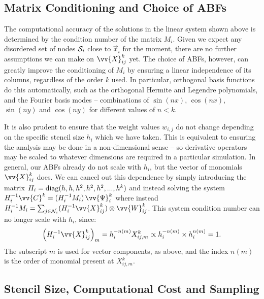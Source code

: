 \subsection{Matrix Conditioning and Choice of ABFs}

The computational accuracy of the solutions in the linear system shown above is determined by the condition number of the matrix $M_i$. Given we expect any disordered set of nodes $\cl{S}_i$ close to $\vec{x}_i$ for the moment, there are no further assumptions we can make on $\vv{X}^k_{ij}$ yet. The choice of ABFs, however, can greatly improve the conditioning of $M_i$ by ensuring a linear independence of its columns, regardless of the order $k$ used. In particular, orthogonal basis functions do this automatically, such as the orthogonal Hermite and Legendre polynomials, and the Fourier basis modes -- combinations of $\sin(nx)$, $\cos(nx)$, $\sin(ny)$ and $\cos(ny)$ for different values of $n < k$.

It is also prudent to ensure that the weight values $w_{i ,j}$ do not change depending on the specific stencil size $h_i$ which we have taken. This is equivalent to ensuring the analysis may be done in a non-dimensional sense -- so derivative operators may be scaled to whatever dimensions are required in a particular simulation. In general, our ABFs already do not scale with $h_i$, but the vector of monomials $\vv{X}^k_{ij}$ does. We can cancel out this dependence by simply introducing the matrix $H_i = \rm{diag}(h, h, h^2, h^2, h^2, ..., h^k)$ and instead solving the system $H_i^{-1} \vv{C}^k = (H_i^{-1} M_i) \, \vv{\Psi}^k_i$ where instead $H_i^{-1} M_i = \sum_{j \in \cl{N}_i} (H_i^{-1} \vv{X}^k_{ij}) \otimes \vv{W}^k_{ij}$. This system condition number can no longer scale with $h_i$, since:
\begin{equation}
\left( H_i^{-1} \vv{X}^k_{ij} \right)_m
= h_i^{-n(m)} X^k_{ij, m}
\propto h_i^{-n(m)} \times h_i^{n(m)} = 1.
\end{equation}
The subscript $m$ is used for vector components, as above, and the index $n(m)$ is the order of monomial present at $X^k_{ij, m}$.



\subsection{Stencil Size, Computational Cost and Sampling}

